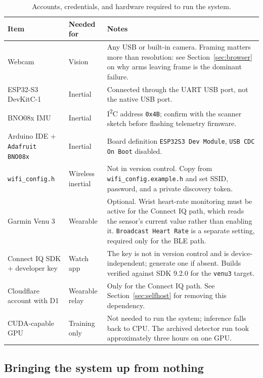 \documentclass[11pt,a4paper]{article}
\newcommand{\code}[1]{\texttt{\small #1}}
\begin{document}
\begin{table}[H]
\centering
\small
\caption{Accounts, credentials, and hardware required to run the system.}
\label{tab:requirements}
\begin{tabularx}{\textwidth}{@{}L{4.2cm} L{2.4cm} Y@{}}
\toprule
\textbf{Item} & \textbf{Needed for} & \textbf{Notes} \\
\midrule
Webcam & Vision & Any USB or built-in camera. Framing matters more than resolution: see Section~\ref{sec:browser} on why arms leaving frame is the dominant failure. \\
\addlinespace
ESP32-S3 DevKitC-1 & Inertial & Connected through the UART USB port, not the native USB port. \\
\addlinespace
BNO08x IMU & Inertial & I\textsuperscript{2}C address \code{0x4B}; confirm with the scanner sketch before flashing telemetry firmware. \\
\addlinespace
Arduino IDE + \code{Adafruit BNO08x} & Inertial & Board definition \code{ESP32S3 Dev Module}, \code{USB CDC On Boot} disabled. \\
\addlinespace
\code{wifi\_config.h} & Wireless inertial & Not in version control. Copy from \code{wifi\_config.example.h} and set SSID, password, and a private discovery token. \\
\addlinespace
Garmin Venu 3 & Wearable & Optional. Wrist heart-rate monitoring must be active for the Connect IQ path, which reads the sensor's current value rather than enabling it. \code{Broadcast Heart Rate} is a separate setting, required only for the BLE path. \\
\addlinespace
Connect IQ SDK + developer key & Watch app & The key is not in version control and is device-independent; generate one if absent. Builds verified against SDK 9.2.0 for the \code{venu3} target. \\
\addlinespace
Cloudflare account with D1 & Wearable relay & Only for the Connect IQ path. See Section~\ref{sec:selfhost} for removing this dependency. \\
\addlinespace
CUDA-capable GPU & Training only & Not needed to run the system; inference falls back to CPU. The archived detector run took approximately three hours on one GPU. \\
\bottomrule
\end{tabularx}
\end{table}

\subsection{Bringing the system up from nothing}
\end{document}

